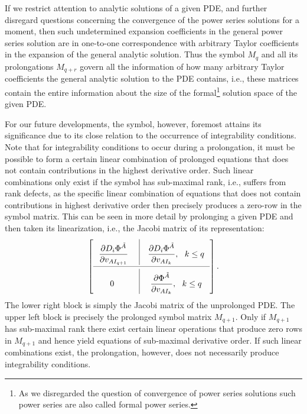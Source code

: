 If we restrict attention to analytic solutions of a given PDE, and further disregard questions concerning the convergence of the power series solutions for a moment, then such undetermined expansion coefficients in the general power series solution are in one-to-one correspondence with arbitrary Taylor coefficients in the expansion of the general analytic solution. Thus the symbol $M_q$ and all its prolongations $M_{q+r}$ govern all the information of how many arbitrary Taylor coefficients the general analytic solution to the PDE contains, i.e., these matrices contain the entire information about the size of the formal\footnote{As we disregarded the question of convergence of power series solutions such power series are also called formal power series. } solution space of the given PDE. 

For our future developments, the symbol, however, foremost attains its significance due to its close relation to the occurrence of integrability conditions.
Note that for integrability conditions to occur during a prolongation, it must be possible to form a certain linear combination of prolonged equations that does not contain contributions in the highest derivative order. Such linear combinations only exist if the symbol has sub-maximal rank, i.e., suffers from rank defects, as the specific linear combination of equations that does not contain contributions in highest derivative order then precisely produces a zero-row in the symbol matrix. This can be seen in more detail by prolonging a given PDE and then taken its linearization, i.e., the Jacobi matrix of its representation:
\begin{align}
\def\arraystretch{2.5}
\begin{bmatrix}
      \ \ \mathlarger{{\frac{\partial D_i\Phi^{\tilde{A}}}{\partial v_{AI_{q+1}}}}} \ & \vline & \mathlarger{\frac{\partial D_i \Phi^{\tilde{A}}}{\partial v_{AI_k}}}, \ \ k \leq q \ \  \\
        \cmidrule(lr){1-3}
        \mathlarger{0} & \vline & \mathlarger{\frac{\partial \Phi^{\tilde{A}}}{\partial v_{AI_k}}}, \ \ k \leq q \ \
\end{bmatrix}.
\end{align}
The lower right block is simply the Jacobi matrix of the unprolonged PDE. The upper left block is precisely the prolonged symbol matrix $M_{q+1}$. Only if $M_{q+1}$ has sub-maximal rank there exist certain linear operations that produce zero rows in $M_{q+1}$ and hence yield equations of sub-maximal derivative order. If such linear combinations exist, the prolongation, however, does not necessarily produce integrability conditions.
